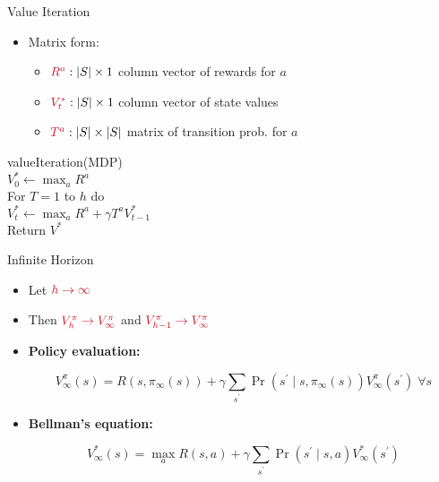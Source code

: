 \documentclass[11pt,table]{beamer}
\begin{document}
\begin{frame}{Value Iteration}

   \begin{itemize}
    \item Matrix form: 

    \begin{itemize}
        \item[] $\textcolor{red1}{R^{a}}:|S| \times 1$ column vector of rewards for $a$ 
        
        \item[]$\textcolor{red1}{V_{t}^{*}}:|S| \times 1$ column vector of state values 
        
        \item[]$\textcolor{red1}{T^{a}}:|S| \times|S|$ matrix of transition prob. for $a$ 
    \end{itemize}
    \end{itemize} 

\begin{tcolorbox}[colframe=black, boxrule=1pt, sharp corners]
\textcolor{red1}{valueIteration(MDP)}\\
$
V_{0}^{*} \leftarrow \max _{a} R^{a}
$\\

For $T=1$ to $h$ do\\
\hspace*{5mm} $
V_{t}^{*} \leftarrow \max _{a} R^{a}+\gamma T^{a} V_{t-1}^{*}
$\\

Return $V^{*}$

\end{tcolorbox}
    
\end{frame}

\begin{frame}{Infinite Horizon}

\begin{itemize}
    \item Let $\textcolor{red1}{h \rightarrow \infty}$

\item Then $\textcolor{red1}{V_{h}^{\pi} \rightarrow V_{\infty}^{\pi}}$ and $\textcolor{red1}{V_{h-1}^{\pi} \rightarrow V_{\infty}^{\pi}}$\\[2ex]

\item \textbf{Policy evaluation:}

$$
V_{\infty}^{\pi}(s)=R\left(s, \pi_{\infty}(s)\right)+\gamma \sum_{s^{\prime}} \operatorname{Pr}\left(s^{\prime} \mid s, \pi_{\infty}(s)\right) V_{\infty}^{\pi}\left(s^{\prime}\right) \; \forall s
$$

\item \textbf{Bellman's equation:}

$$
V_{\infty}^{*}(s)=\max _{a} R(s, a)+\gamma \sum_{s^{\prime}} \operatorname{Pr}\left(s^{\prime} \mid s, a\right) V_{\infty}^{*}\left(s^{\prime}\right)
$$
\end{itemize}
    
\end{frame}
\end{document}
